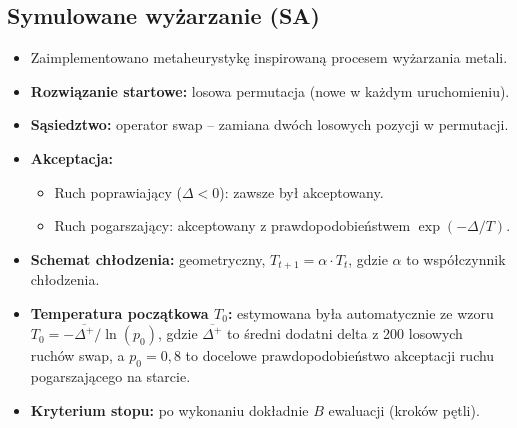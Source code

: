 \documentclass[11pt,a4paper]{article}
\begin{document}
\subsection{Symulowane wyżarzanie (SA)}
\label{sec:sa}
\begin{itemize}
    \item Zaimplementowano metaheurystykę inspirowaną procesem wyżarzania metali.
    \item \textbf{Rozwiązanie startowe:} losowa permutacja (nowe w każdym uruchomieniu).
    \item \textbf{Sąsiedztwo:} operator swap -- zamiana dwóch losowych pozycji w permutacji.
    \item \textbf{Akceptacja:}
    \begin{itemize}
        \item Ruch poprawiający ($\Delta < 0$): zawsze był akceptowany.
        \item Ruch pogarszający: akceptowany z prawdopodobieństwem $\exp(-\Delta/T)$.
    \end{itemize}
    \item \textbf{Schemat chłodzenia:} geometryczny, $T_{t+1} = \alpha \cdot T_t$, gdzie $\alpha$ to współczynnik chłodzenia.
    \item \textbf{Temperatura początkowa $T_0$:} estymowana była automatycznie ze wzoru
    $T_0 = -\overline{\Delta^+} / \ln(p_0)$,
    gdzie $\overline{\Delta^+}$ to średni dodatni delta z 200 losowych ruchów swap, a $p_0 = 0{,}8$ to docelowe prawdopodobieństwo akceptacji ruchu pogarszającego na starcie.
    \item \textbf{Kryterium stopu:} po wykonaniu dokładnie $B$ ewaluacji (kroków pętli).
\end{itemize}
\end{document}
